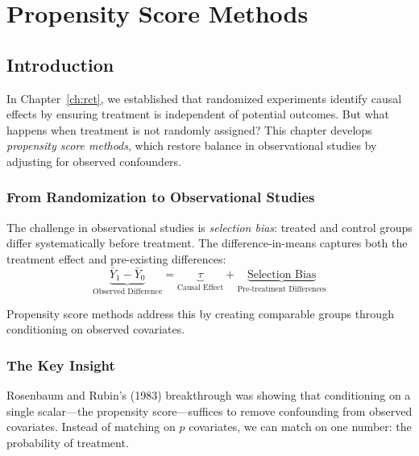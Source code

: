 \chapter{Propensity Score Methods}
\label{ch:propensity}


\section{Introduction}
\label{sec:psm_intro}

In Chapter~\ref{ch:rct}, we established that randomized experiments identify causal effects by ensuring treatment is independent of potential outcomes. But what happens when treatment is not randomly assigned? This chapter develops \emph{propensity score methods}, which restore balance in observational studies by adjusting for observed confounders.

\subsection{From Randomization to Observational Studies}

The challenge in observational studies is \emph{selection bias}: treated and control groups differ systematically before treatment. The difference-in-means captures both the treatment effect and pre-existing differences:
\begin{equation}
\underbrace{\bar{Y}_1 - \bar{Y}_0}_{\text{Observed Difference}} = \underbrace{\tau}_{\text{Causal Effect}} + \underbrace{\text{Selection Bias}}_{\text{Pre-treatment Differences}}
\end{equation}

Propensity score methods address this by creating comparable groups through conditioning on observed covariates.

\subsection{The Key Insight}

Rosenbaum and Rubin's (1983) breakthrough was showing that conditioning on a single scalar---the propensity score---suffices to remove confounding from observed covariates. Instead of matching on $p$ covariates, we can match on one number: the probability of treatment.

